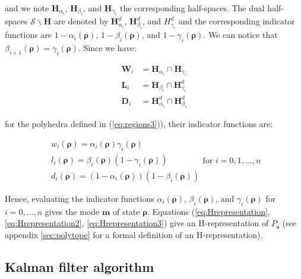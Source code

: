 \noindent and we note $\textbf{H}_{\alpha_{i}}$, $\textbf{H}_{\beta_{i}}$, and $\textbf{H}_{\gamma_{i}}$ the corresponding half-spaces. The dual half-spaces $\mathcal{S}\backslash \textbf{H}$ are denoted by $\textbf{H}^{d}_{\alpha_{i}}$, $\textbf{H}^{d}_{\beta_{i}}$, and $H^{d}_{\gamma_{i}}$ and the corresponding indicator functions are $1-\alpha_{i}(\boldsymbol\rho)$, $1-\beta_{i}(\boldsymbol\rho)$, and $1-\gamma_{i}(\boldsymbol\rho)$. We can notice that $\beta_{i+1}(\boldsymbol\rho)=\gamma_{i}(\boldsymbol\rho)$. Since we have:

\begin{equation}
\begin{array}{ll}
\textbf{W}_{i}&=\textbf{H}_{\alpha_{i}}\cap \textbf{H}_{\gamma_{i}}\\
\textbf{L}_{i}&=\textbf{H}_{\beta_{i}}\cap \textbf{H}^{d}_{\gamma_{i}}\\
\textbf{D}_{i}&=\textbf{H}^{d}_{\alpha_{i}}\cap \textbf{H}^{d}_{\beta_{i}}
\end{array}
\label{eq:Hrepresentation3}
\end{equation}

\noindent for the polyhedra defined in (\ref{eq:regions3})), their indicator functions are:

\begin{equation}
\begin{array}{l}
w_{i}(\boldsymbol\rho)=\alpha_{i}(\boldsymbol\rho)\gamma_{i}(\boldsymbol\rho)\\
l_{i}(\boldsymbol\rho)=\beta_{i}(\boldsymbol\rho)(1-\gamma_{i}(\boldsymbol\rho))\\
d_{i}(\boldsymbol\rho)=(1-\alpha_{i}(\boldsymbol\rho))(1-\beta_{i}(\boldsymbol\rho))
\end{array}
\text{for }i=0,1,...,n
\label{eq:indicators2}
\end{equation}

Hence, evaluating the indicator functions $\alpha_{i}(\boldsymbol\rho)$, $\beta_{i}(\boldsymbol\rho)$, and $\gamma_{i}(\boldsymbol\rho)$ for $i=0,...,n$ gives the mode $\boldsymbol m$ of state $\boldsymbol\rho$. Equations (\ref{eq:Hrepresentation}, \ref{eq:Hrepresentation2}, \ref{eq:Hrepresentation3}) give an H-representation of $P_{\boldsymbol s}$ (see appendix \ref{sec:polytope} for a formal definition of an H-representation).


\subsection{Kalman filter algorithm}

